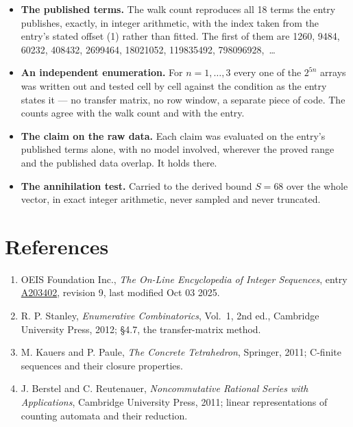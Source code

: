 \documentclass[11pt]{article}
\theoremstyle{definition}
\begin{document}
\begin{itemize}

\item {\bfseries The published terms.} The walk count reproduces all 18 terms the entry publishes, exactly, in integer arithmetic, with the index taken from the entry's stated offset (1) rather than fitted. The first of them are 1260, 9484, 60232, 408432, 2699464, 18021052, 119835492, 798096928,~\dots

\item {\bfseries An independent enumeration.} For $n = 1,\dots,3$ every one of the $2^{5n}$ arrays was written out and tested cell by cell against the condition as the entry states it --- no transfer matrix, no row window, a separate piece of code. The counts agree with the walk count and with the entry.

\item {\bfseries The claim on the raw data.} Each claim was evaluated on the entry's published terms alone, with no model involved, wherever the proved range and the published data overlap. It holds there.

\item {\bfseries The annihilation test.} Carried to the derived bound $S = 68$ over the whole vector, in exact integer arithmetic, never sampled and never truncated.

\end{itemize}

\section{References}

\begin{enumerate}

\item OEIS Foundation Inc., \emph{The On-Line Encyclopedia of Integer Sequences}, entry \href{https://oeis.org/A203402}{A203402}, revision 9, last modified Oct 03 2025.

\item R. P. Stanley, \emph{Enumerative Combinatorics}, Vol.~1, 2nd ed., Cambridge University Press, 2012; \S4.7, the transfer-matrix method.

\item M. Kauers and P. Paule, \emph{The Concrete Tetrahedron}, Springer, 2011; C-finite sequences and their closure properties.

\item J. Berstel and C. Reutenauer, \emph{Noncommutative Rational Series with Applications}, Cambridge University Press, 2011; linear representations of counting automata and their reduction.

\end{enumerate}
\end{document}
